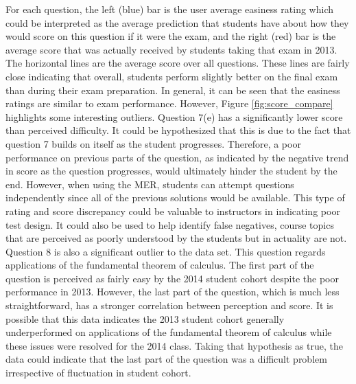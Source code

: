 \documentclass{primus}
\begin{document}
\noindent{}For each question, the left (blue) bar is the user average easiness rating which could be interpreted as the average prediction that students have about how they would score on this question if it were the exam, and the right (red) bar is the average score that was actually received by students taking that exam in 2013. The horizontal lines are the average score over all questions. These lines are fairly close indicating that overall, students perform slightly better on the final exam than during their exam preparation. In general, it can be seen that the easiness ratings are similar to exam performance. However, Figure \ref{fig:score_compare} highlights some interesting outliers. Question 7(e) has a significantly lower score than perceived difficulty. It could be hypothesized that this is due to the fact that question 7 builds on itself as the student progresses. Therefore, a poor performance on previous parts of the question, as indicated by the negative trend in score as the question progresses, would ultimately hinder the student by the end. However, when using the MER, students can attempt questions independently since all of the previous solutions would be available. This type of rating and score discrepancy could be valuable to instructors in indicating poor test design. It could also be used to help identify false negatives, course topics that are perceived as poorly understood by the students but in actuality are not. Question 8 is also a significant outlier to the data set. This question regards applications of the fundamental theorem of calculus. The first part of the question is perceived as fairly easy by the 2014 student cohort despite the poor performance in 2013. However, the last part of the question, which is much less straightforward, has a stronger correlation between perception and score. It is possible that this data indicates the 2013 student cohort generally underperformed on applications of the fundamental theorem of calculus while these issues were resolved for the 2014 class. Taking that hypothesis as true, the data could indicate that the last part of the question was a difficult problem irrespective of fluctuation in student cohort.
\\\\
\end{document}
